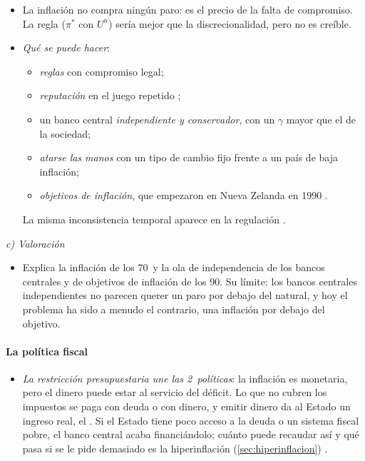 \documentclass[11pt]{article}
\begin{document}
\begin{itemize}
\item La inflación no compra ningún paro: es el precio de la falta de compromiso. La regla ($\pi^*$ con $U^n$) sería mejor que la discrecionalidad, pero no es creíble.
\item \emph{Qué se puede hacer}:
  \begin{itemize}
  \item \emph{reglas} con compromiso legal;
  \item \emph{reputación} en el juego repetido ;
  \item un banco central \emph{independiente y conservador}, con un $\gamma$ mayor que el de la sociedad\nocite{Rogoff1985Optimal};
  \item \emph{atarse las manos} con un tipo de cambio fijo frente a un país de baja inflación\nocite{GiavazziPagano1988Advantage};
  \item \emph{objetivos de inflación}, que empezaron en Nueva Zelanda en 1990\nocite{BernankeEtAl1997NuevaZelanda} .
  \end{itemize}
  La misma inconsistencia temporal aparece en la regulación .
\end{itemize}

\hspace*{4.8em}\emph{c) Valoración}

\begin{itemize}
\item Explica la inflación de los 70~y la ola de independencia de los bancos centrales y de objetivos de inflación de los 90. Su límite: los bancos centrales independientes no parecen querer un paro por debajo del natural, y hoy el problema ha sido a menudo el contrario, una inflación por debajo del objetivo.
\end{itemize}

\paragraph{La política fiscal}\label{sec:politica-fiscal}

\begin{itemize}
\item \emph{La restricción presupuestaria une las 2~políticas}: la inflación es monetaria, pero el dinero puede estar al servicio del déficit. Lo que no cubren los impuestos se paga con deuda o con dinero, y emitir dinero da al Estado un ingreso real, el . Si el Estado tiene poco acceso a la deuda o un sistema fiscal pobre, el banco central acaba financiándolo; cuánto puede recaudar así y qué pasa si se le pide demasiado es la hiperinflación (\ref{sec:hiperinflacion}) .
\end{itemize}
\end{document}
